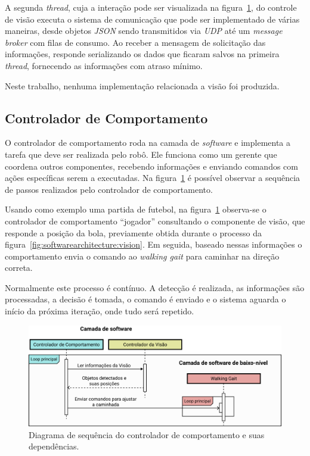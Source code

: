 A segunda \textit{thread}, cuja a interação pode ser visualizada na figura~\ref{fig:softwarearchitecture:software}, do controle de visão executa o sistema de comunicação que pode ser implementado de várias maneiras, desde objetos \textit{JSON} sendo transmitidos via \textit{UDP} até um \textit{message broker} com filas de consumo. Ao receber a mensagem de solicitação das informações, responde serializando os dados que ficaram salvos na primeira \textit{thread}, fornecendo as informações com atraso mínimo.

Neste trabalho, nenhuma implementação relacionada a visão foi produzida.

\subsection{Controlador de Comportamento}

O controlador de comportamento roda na camada de \textit{software} e implementa a tarefa que deve ser realizada pelo robô. Ele funciona como um gerente que coordena outros componentes, recebendo informações e enviando comandos com ações específicas serem a executadas. Na figura~\ref{fig:softwarearchitecture:software} é possível observar a sequência de passos realizados pelo controlador de comportamento.

Usando como exemplo uma partida de futebol, na figura~\ref{fig:softwarearchitecture:software} observa-se o controlador de comportamento ``jogador'' consultando o componente de visão, que responde a posição da bola, previamente obtida durante o processo da figura~\ref{fig:softwarearchitecture:vision}. Em seguida, baseado nessas informações o comportamento envia o comando ao \textit{walking gait} para caminhar na direção correta.

Normalmente este processo é contínuo. A detecção é realizada, as informações são processadas, a decisão é tomada, o comando é enviado e o sistema aguarda o início da próxima iteração, onde tudo será repetido.

\begin{figure}[htb]
	\centering
	\includegraphics[scale=1]{imagens/svg/softwarearchitecture-software}
	\caption{Diagrama de sequência do controlador de comportamento e suas dependências.}
	\label{fig:softwarearchitecture:software}
\end{figure}

